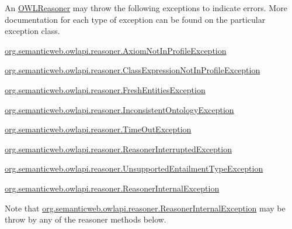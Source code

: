 An {\ttfamily \hyperlink{interfaceorg_1_1semanticweb_1_1owlapi_1_1reasoner_1_1_o_w_l_reasoner}{O\-W\-L\-Reasoner}} may throw the following exceptions to indicate errors. More documentation for each type of exception can be found on the particular exception class. 
\begin{DoxyItemize}
\item \hyperlink{classorg_1_1semanticweb_1_1owlapi_1_1reasoner_1_1_axiom_not_in_profile_exception}{org.\-semanticweb.\-owlapi.\-reasoner.\-Axiom\-Not\-In\-Profile\-Exception} 
\item \hyperlink{classorg_1_1semanticweb_1_1owlapi_1_1reasoner_1_1_class_expression_not_in_profile_exception}{org.\-semanticweb.\-owlapi.\-reasoner.\-Class\-Expression\-Not\-In\-Profile\-Exception} 
\item \hyperlink{classorg_1_1semanticweb_1_1owlapi_1_1reasoner_1_1_fresh_entities_exception}{org.\-semanticweb.\-owlapi.\-reasoner.\-Fresh\-Entities\-Exception} 
\item \hyperlink{classorg_1_1semanticweb_1_1owlapi_1_1reasoner_1_1_inconsistent_ontology_exception}{org.\-semanticweb.\-owlapi.\-reasoner.\-Inconsistent\-Ontology\-Exception} 
\item \hyperlink{classorg_1_1semanticweb_1_1owlapi_1_1reasoner_1_1_time_out_exception}{org.\-semanticweb.\-owlapi.\-reasoner.\-Time\-Out\-Exception} 
\item \hyperlink{classorg_1_1semanticweb_1_1owlapi_1_1reasoner_1_1_reasoner_interrupted_exception}{org.\-semanticweb.\-owlapi.\-reasoner.\-Reasoner\-Interrupted\-Exception} 
\item \hyperlink{classorg_1_1semanticweb_1_1owlapi_1_1reasoner_1_1_unsupported_entailment_type_exception}{org.\-semanticweb.\-owlapi.\-reasoner.\-Unsupported\-Entailment\-Type\-Exception} 
\item \hyperlink{classorg_1_1semanticweb_1_1owlapi_1_1reasoner_1_1_reasoner_internal_exception}{org.\-semanticweb.\-owlapi.\-reasoner.\-Reasoner\-Internal\-Exception} 
\end{DoxyItemize}Note that \hyperlink{classorg_1_1semanticweb_1_1owlapi_1_1reasoner_1_1_reasoner_internal_exception}{org.\-semanticweb.\-owlapi.\-reasoner.\-Reasoner\-Internal\-Exception} may be throw by any of the reasoner methods below. 

